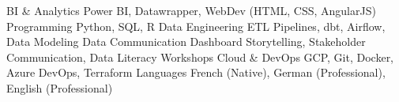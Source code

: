 \begin{cvskills}
  \cvskill
    {BI \& Analytics}
    {Power BI, Datawrapper, WebDev (HTML, CSS, AngularJS)}
  \cvskill
    {Programming}
    {Python, SQL, R}
  \cvskill
    {Data Engineering}
    {ETL Pipelines, dbt, Airflow, Data Modeling}
  \cvskill
    {Data Communication}
    {Dashboard Storytelling, Stakeholder Communication, Data Literacy Workshops}
  \cvskill
    {Cloud \& DevOps}
    {GCP, Git, Docker, Azure DevOps, Terraform}
  \cvskill
    {Languages}
    {French (Native), German (Professional), English (Professional)}
\end{cvskills}
